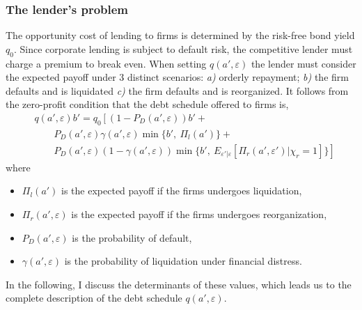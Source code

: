 \documentclass[12pt]{article}
\begin{document}
\subsubsection{The lender's problem}    \label{sec: The lender's problem}
The opportunity cost of lending to firms is determined by the risk-free bond yield $q_0$. Since corporate lending is subject to default risk, the competitive lender must charge a premium to break even. When setting $q(a',\varepsilon)$ the lender must consider the expected payoff under 3 distinct scenarios: \textit{a)} orderly repayment; \textit{b)} the firm defaults and is liquidated \textit{c)} the firm defaults and is reorganized. It follows from the zero-profit condition that the debt schedule offered to firms is, 
\begin{equation} \label{eq:q}
    \begin{split}
        & q(a', \varepsilon)b' = q_0 \left[ \left(1-P_D(a', \varepsilon)\right)b' + \right. \\
        & \qquad P_D(a', \varepsilon) \gamma(a', \varepsilon) \min \{b', \ \Pi_{l}(a')\} + \\ 
        & \qquad \left. P_D(a', \varepsilon) (1-\gamma(a', \varepsilon))\min \{b', \ E_{\varepsilon' | \varepsilon} [ \Pi_{r}(a', \varepsilon') |\chi_r = 1 ] \} \right]
    \end{split}
\end{equation}
where 
\begin{itemize}\setlength\itemsep{0em} 
    \item $\Pi_{l}(a')$ is the expected payoff if the firms undergoes liquidation,
    \item $\Pi_{r}(a', \varepsilon)$ is the expected payoff if the firms undergoes reorganization,
    \item $P_D(a', \varepsilon)$ is the probability of default,
    \item $\gamma(a', \varepsilon)$ is the probability of liquidation under financial distress. 
\end{itemize} 
In the following, I discuss the determinants of these values, which leads us to the complete description of the debt schedule $q(a', \varepsilon)$.
\end{document}
